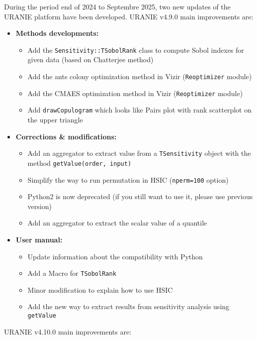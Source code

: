 During the period end of 2024 to Septembre 2025, two new updates of the URANIE platform have been developed. 
URANIE v4.9.0 main improvements are:
\begin{itemize}
	\item \textbf{Methods developments:}
	\begin{itemize}
		\item Add the \texttt{Sensitivity::TSobolRank} class to compute Sobol indexes for given data (based on Chatterjee method)
    	\item Add the ants colony optimization method in Vizir (\texttt{Reoptimizer} module)
    	\item Add the CMAES optimization method in Vizir (\texttt{Reoptimizer} module)
    	\item Add \texttt{drawCopulogram} which looks like Pairs plot with rank scatterplot on the upper triangle
	\end{itemize}
	\item \textbf{Corrections \& modifications:}
	\begin{itemize}
		\item Add an aggregator to extract value from a \texttt{TSensitivity} object with the method \texttt{getValue(order, input)}
    	\item Simplify the way to run permutation in HSIC (\texttt{nperm=100} option)
    	\item Python2 is now deprecated (if you still want to use it, please use previous version)
    	\item Add an aggregator to extract the scalar value of a quantile
	\end{itemize}
	\item \textbf{User manual:}
	\begin{itemize}
		\item Update information about the compatibility with Python
   		\item Add a Macro for \texttt{TSobolRank}
    	\item Minor modification to explain how to use HSIC
    	\item Add the new way to extract results from sensitivity analysis using \texttt{getValue} 
	\end{itemize}
\end{itemize}
URANIE v4.10.0 main improvements are:
